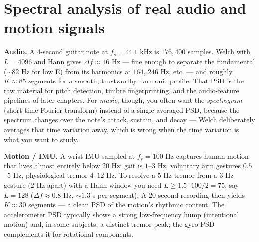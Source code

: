 \section{Spectral analysis of real audio and motion signals}
\label{ch21:real-signals}

\begin{applicationbox}
\textbf{Audio.} A $4$-second guitar note at $f_s=44.1$ kHz is $176{,}400$ samples. Welch with
$L=4096$ and Hann gives $\Delta f\approx 16$ Hz --- fine enough to separate the
fundamental ($\sim 82$ Hz for low E) from its harmonics at $164$, $246$ Hz, etc.
--- and roughly $K\approx 85$ segments for a smooth, trustworthy harmonic profile.
That PSD is the raw material for pitch detection, timbre fingerprinting, and the
audio-feature pipelines of later chapters. For \emph{music}, though, you often want
the \emph{spectrogram} (short-time Fourier transform) instead of a single averaged
PSD, because the spectrum changes over the note's attack, sustain, and decay ---
Welch deliberately averages that time variation away, which is wrong when the
time variation is what you want to study.
\end{applicationbox}

\begin{applicationbox}
\textbf{Motion / IMU.} A wrist IMU sampled at $f_s=100$ Hz captures human motion that lives almost
entirely below $20$ Hz: gait is $1$--$3$ Hz, voluntary arm gestures $0.5$--$5$ Hz,
physiological tremor $4$--$12$ Hz. To resolve a $5$ Hz tremor from a $3$ Hz gesture
($2$ Hz apart) with a Hann window you need $L \ge 1.5\cdot 100/2 = 75$, say
$L=128$ ($\Delta f\approx 0.8$ Hz, $\sim 1.3$ s per segment). A $20$-second
recording then yields $K\approx 30$ segments --- a clean PSD of the motion's
rhythmic content. The accelerometer PSD typically shows a strong low-frequency
hump (intentional motion) and, in some subjects, a distinct tremor peak; the gyro
PSD complements it for rotational components.
\end{applicationbox}

